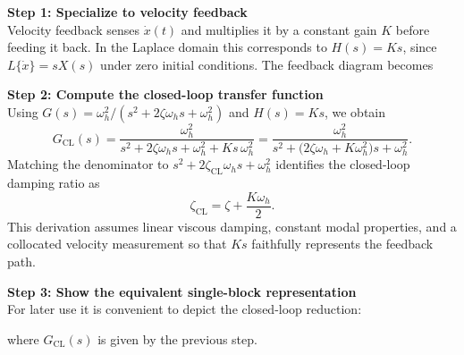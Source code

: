\documentclass[12pt]{article}
\begin{document}
\begin{stepbox}
\textbf{Step 1: Specialize to velocity feedback}\\[0.5em]
Velocity feedback senses $\dot{x}(t)$ and multiplies it by a constant gain $K$ before feeding it back. In the Laplace domain this corresponds to $H(s)=K s$, since $L\{\dot{x}\}=sX(s)$ under zero initial conditions. The feedback diagram becomes
\begin{center}
\end{center}
\end{stepbox}

\begin{stepbox}
\textbf{Step 2: Compute the closed-loop transfer function}\\[0.5em]
Using $G(s)=\omega_h^2/(s^2+2\zeta\omega_h s+\omega_h^2)$ and $H(s)=Ks$, we obtain
\[
G_{\text{CL}}(s)=\frac{\omega_h^2}{s^2+2\zeta\omega_h s+\omega_h^2 + Ks\,\omega_h^2}
= \frac{\omega_h^2}{s^2+\bigl(2\zeta\omega_h + K\omega_h^2\bigr)s + \omega_h^2}.
\]
Matching the denominator to $s^2 + 2\zeta_{\text{CL}}\omega_h s+\omega_h^2$ identifies the closed-loop damping ratio as
\[
\zeta_{\text{CL}} = \zeta + \frac{K\omega_h}{2}.
\]
This derivation assumes linear viscous damping, constant modal properties, and a collocated velocity measurement so that $Ks$ faithfully represents the feedback path.
\end{stepbox}

\begin{stepbox}
\textbf{Step 3: Show the equivalent single-block representation}\\[0.5em]
For later use it is convenient to depict the closed-loop reduction:
\begin{center}
\end{center}
where $G_{\text{CL}}(s)$ is given by the previous step.
\end{stepbox}
\end{document}
